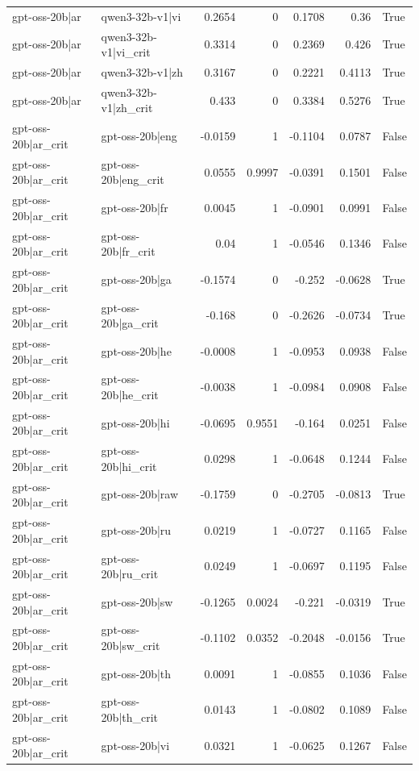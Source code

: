 \begin{table}
\begin{tabular}{l l r r r r l}
gpt-oss-20b|ar & qwen3-32b-v1|vi & 0.2654 & 0 & 0.1708 & 0.36 & True \\
gpt-oss-20b|ar & qwen3-32b-v1|vi_crit & 0.3314 & 0 & 0.2369 & 0.426 & True \\
gpt-oss-20b|ar & qwen3-32b-v1|zh & 0.3167 & 0 & 0.2221 & 0.4113 & True \\
gpt-oss-20b|ar & qwen3-32b-v1|zh_crit & 0.433 & 0 & 0.3384 & 0.5276 & True \\
gpt-oss-20b|ar_crit & gpt-oss-20b|eng & -0.0159 & 1 & -0.1104 & 0.0787 & False \\
gpt-oss-20b|ar_crit & gpt-oss-20b|eng_crit & 0.0555 & 0.9997 & -0.0391 & 0.1501 & False \\
gpt-oss-20b|ar_crit & gpt-oss-20b|fr & 0.0045 & 1 & -0.0901 & 0.0991 & False \\
gpt-oss-20b|ar_crit & gpt-oss-20b|fr_crit & 0.04 & 1 & -0.0546 & 0.1346 & False \\
gpt-oss-20b|ar_crit & gpt-oss-20b|ga & -0.1574 & 0 & -0.252 & -0.0628 & True \\
gpt-oss-20b|ar_crit & gpt-oss-20b|ga_crit & -0.168 & 0 & -0.2626 & -0.0734 & True \\
gpt-oss-20b|ar_crit & gpt-oss-20b|he & -0.0008 & 1 & -0.0953 & 0.0938 & False \\
gpt-oss-20b|ar_crit & gpt-oss-20b|he_crit & -0.0038 & 1 & -0.0984 & 0.0908 & False \\
gpt-oss-20b|ar_crit & gpt-oss-20b|hi & -0.0695 & 0.9551 & -0.164 & 0.0251 & False \\
gpt-oss-20b|ar_crit & gpt-oss-20b|hi_crit & 0.0298 & 1 & -0.0648 & 0.1244 & False \\
gpt-oss-20b|ar_crit & gpt-oss-20b|raw & -0.1759 & 0 & -0.2705 & -0.0813 & True \\
gpt-oss-20b|ar_crit & gpt-oss-20b|ru & 0.0219 & 1 & -0.0727 & 0.1165 & False \\
gpt-oss-20b|ar_crit & gpt-oss-20b|ru_crit & 0.0249 & 1 & -0.0697 & 0.1195 & False \\
gpt-oss-20b|ar_crit & gpt-oss-20b|sw & -0.1265 & 0.0024 & -0.221 & -0.0319 & True \\
gpt-oss-20b|ar_crit & gpt-oss-20b|sw_crit & -0.1102 & 0.0352 & -0.2048 & -0.0156 & True \\
gpt-oss-20b|ar_crit & gpt-oss-20b|th & 0.0091 & 1 & -0.0855 & 0.1036 & False \\
gpt-oss-20b|ar_crit & gpt-oss-20b|th_crit & 0.0143 & 1 & -0.0802 & 0.1089 & False \\
gpt-oss-20b|ar_crit & gpt-oss-20b|vi & 0.0321 & 1 & -0.0625 & 0.1267 & False \\

\end{tabular}
\end{table}
